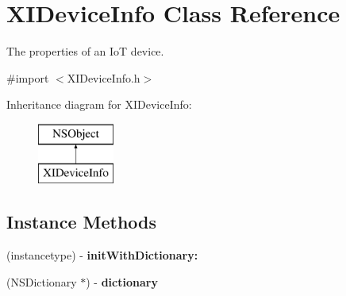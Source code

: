 \hypertarget{class_x_i_device_info}{}\section{X\+I\+Device\+Info Class Reference}
\label{class_x_i_device_info}


The properties of an IoT device.  




{\ttfamily \#import $<$X\+I\+Device\+Info.\+h$>$}

Inheritance diagram for X\+I\+Device\+Info\+:\begin{figure}[H]
\begin{center}
\leavevmode
\includegraphics[height=2.000000cm]{class_x_i_device_info}
\end{center}
\end{figure}
\subsection*{Instance Methods}
\begin{DoxyCompactItemize}
\item 
\hypertarget{class_x_i_device_info_ae331cb2141cac26c4b56dd292a9db9f6}{}\label{class_x_i_device_info_ae331cb2141cac26c4b56dd292a9db9f6} 
(instancetype) -\/ {\bfseries init\+With\+Dictionary\+:}
\item 
\hypertarget{class_x_i_device_info_a389ba1c44ed1b2f27683c87509e4d6b8}{}\label{class_x_i_device_info_a389ba1c44ed1b2f27683c87509e4d6b8} 
(N\+S\+Dictionary $\ast$) -\/ {\bfseries dictionary}
\end{DoxyCompactItemize}
